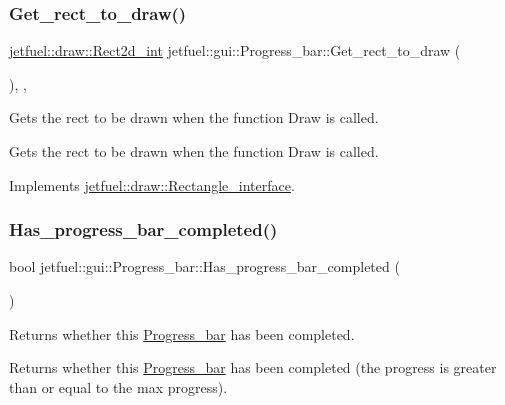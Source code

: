 \subsubsection{\texorpdfstring{Get\+\_\+rect\+\_\+to\+\_\+draw()}{Get\_rect\_to\_draw()}}
{\footnotesize\ttfamily \hyperlink{classjetfuel_1_1draw_1_1Rect2d}{jetfuel\+::draw\+::\+Rect2d\+\_\+int} jetfuel\+::gui\+::\+Progress\+\_\+bar\+::\+Get\+\_\+rect\+\_\+to\+\_\+draw (\begin{DoxyParamCaption}{ }\end{DoxyParamCaption})\hspace{0.3cm}{\ttfamily [inline]}, {\ttfamily [override]}, {\ttfamily [virtual]}}



Gets the rect to be drawn when the function Draw is called. 

Gets the rect to be drawn when the function Draw is called. 

Implements \hyperlink{classjetfuel_1_1draw_1_1Rectangle__interface_a03fd3b6842ab7b3065379caec407296f}{jetfuel\+::draw\+::\+Rectangle\+\_\+interface}.

\mbox{\label{classjetfuel_1_1gui_1_1Progress__bar_ab21545ddc2fbd947f1fbe9bdf11b959f}} 
\subsubsection{\texorpdfstring{Has\+\_\+progress\+\_\+bar\+\_\+completed()}{Has\_progress\_bar\_completed()}}
{\footnotesize\ttfamily bool jetfuel\+::gui\+::\+Progress\+\_\+bar\+::\+Has\+\_\+progress\+\_\+bar\+\_\+completed (\begin{DoxyParamCaption}{ }\end{DoxyParamCaption})\hspace{0.3cm}{\ttfamily [inline]}}



Returns whether this \hyperlink{classjetfuel_1_1gui_1_1Progress__bar}{Progress\+\_\+bar} has been completed. 

Returns whether this \hyperlink{classjetfuel_1_1gui_1_1Progress__bar}{Progress\+\_\+bar} has been completed (the progress is greater than or equal to the max progress). \mbox{\label{classjetfuel_1_1gui_1_1Progress__bar_a4871a444df390b3a4996ce8bb67f90c8}} 
